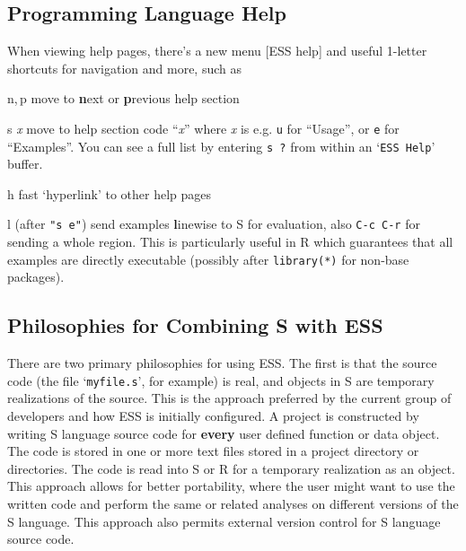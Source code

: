 \documentclass{article}
\newcommand{\stexttt}[1]{{\small\texttt{#1}}}
\newcommand{\file}[1]{`\stexttt{#1}'}
\begin{document}
\subsection{Programming Language Help}
\label{sec:S:help}

When viewing help pages, there's a new menu \textsf{[ESS help]} and
useful 1-letter shortcuts for navigation and more, such as
\begin{list}{}{\renewcommand{\makelabel}[1]{\bf#1\hfill}}
\item[n,\,p] move to \textbf{n}ext or \textbf{p}revious help section
\item[{s \textit{x}}] move to help section code ``\textit{x}'' where
  \textit{x} is e.g. \stexttt{u} for ``Usage'', or \stexttt{e} for
  ``Examples''.  You can see a full list by entering \stexttt{s ?} from within
an \file{ESS Help} buffer.
\item[h] fast `hyperlink' to other help pages
\item[l] (after \stexttt{"s e"}) send examples \textbf{l}inewise to S for
  evaluation, also \stexttt{C-c C-r} for sending a whole region.  This 
  is particularly useful in R which guarantees that all examples are
  directly executable (possibly after \stexttt{library(*)} for non-base
  packages).
\end{list}

\subsection{Philosophies for Combining S with ESS}
\label{sec:S:philosophy}

There are two primary philosophies for using ESS.  The first is that
the source code (the file \file{myfile.s}, for example) is real,
and objects in S are temporary realizations of the source.  This is
the approach preferred by the current group of developers and how ESS
is initially configured.  A project is constructed by writing S
language source code for \textbf{every} user defined function or data
object.  The code is stored in one or more text files stored in a
project directory or directories.  The code is read into S or R for a
temporary realization as an object.  This approach allows for better
portability, where the user might want to use the written code and
perform the same or related analyses on different versions of the S
language.  This approach also permits external version control for
S language source code.
\end{document}
